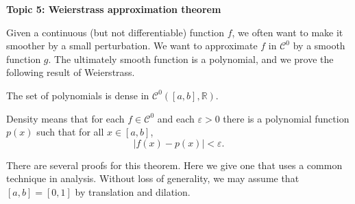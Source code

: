 \documentclass[11pt]{article}
\begin{document}
\begin{center}
  \textbf{Topic 5: Weierstrass approximation theorem}
\end{center}

Given a continuous (but not differentiable) function $f$, we often want to make it smoother by a small perturbation.
We want to approximate $f$ in $\mathcal{C}^0$ by a smooth function $g$.
The ultimately smooth function is a polynomial, and we prove the following result of Weierstrass.

\begin{thm}
  The set of polynomials is dense in $\mathcal{C}^0([a,b], \mathbb{R})$.
\end{thm}

Density means that for each $f \in \mathcal{C}^0$ and each $\varepsilon > 0$ there is a polynomial function $p(x)$ such that for all $x \in [a,b]$,
\[
  |f(x) - p(x)| < \varepsilon.
\]

There are several proofs for this theorem.
Here we give one that uses a common technique in analysis.
Without loss of generality, we may assume that $[a,b] = [0,1]$ by translation and dilation.
\end{document}
